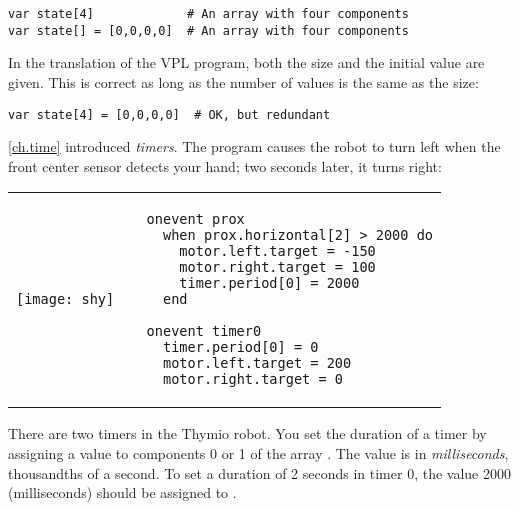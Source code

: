 \begin{footnotesize}
\begin{verbatim}
var state[4]             # An array with four components
var state[] = [0,0,0,0]  # An array with four components
\end{verbatim}
\end{footnotesize}

In the translation of the VPL program, both the size and the initial
value are given. This is correct as long as the number of values is the
same as the size:

\begin{footnotesize}
\begin{verbatim}
var state[4] = [0,0,0,0]  # OK, but redundant
\end{verbatim}
\end{footnotesize}

\newpage


\cref{ch.time} introduced \emph{timers}. The program
 causes the robot to turn left when the front center sensor
detects your hand; two seconds later, it turns right:

\begin{center}
\begin{tabular}{ll}
\texttt{[image: shy]} &
\begin{minipage}[b]{.5\textwidth}
\begin{footnotesize}
\begin{verbatim}
  onevent prox
    when prox.horizontal[2] > 2000 do
      motor.left.target = -150
      motor.right.target = 100
      timer.period[0] = 2000
    end
  
  onevent timer0
    timer.period[0] = 0
    motor.left.target = 200
    motor.right.target = 0
\end{verbatim}
\end{footnotesize}
\end{minipage}
\end{tabular}
\end{center}

There are two timers in the Thymio robot. You set the duration of a
timer by assigning a value to components 0 or 1 of the array
. The value is in \emph{milliseconds}, thousandths of a
second. To set a duration of 2 seconds in timer 0, the value 2000
(milliseconds) should be assigned to .

